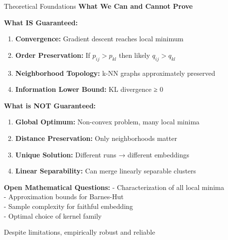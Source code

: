 \documentclass[10pt]{beamer}
\newcommand{\emphtext}[1]{\textcolor{upcblue}{\textbf{#1}}}
\newcommand{\conceptbox}[1]{\colorbox{upcblue!10}{\begin{minipage}{0.85\textwidth}\centering #1\end{minipage}}}
\begin{document}
\begin{frame}{Theoretical Foundations}
\emphtext{What We Can and Cannot Prove}

\vspace{0.3cm}
\textbf{What IS Guaranteed:}
\footnotesize
\begin{enumerate}
\item \textbf{Convergence:} Gradient descent reaches local minimum
\item \textbf{Order Preservation:} If $p_{ij} > p_{kl}$ then likely $q_{ij} > q_{kl}$
\item \textbf{Neighborhood Topology:} k-NN graphs approximately preserved
\item \textbf{Information Lower Bound:} KL divergence ≥ 0
\end{enumerate}

\vspace{0.3cm}
\textbf{What is NOT Guaranteed:}
\footnotesize
\begin{enumerate}
\item \textbf{Global Optimum:} Non-convex problem, many local minima
\item \textbf{Distance Preservation:} Only neighborhoods matter
\item \textbf{Unique Solution:} Different runs → different embeddings
\item \textbf{Linear Separability:} Can merge linearly separable clusters
\end{enumerate}

\vspace{0.3cm}
\textbf{Open Mathematical Questions:}
\footnotesize
- Characterization of all local minima\\
- Approximation bounds for Barnes-Hut\\
- Sample complexity for faithful embedding\\
- Optimal choice of kernel family

\begin{center}
\conceptbox{\footnotesize Despite limitations, empirically robust and reliable}
\end{center}
\end{frame}
\end{document}
